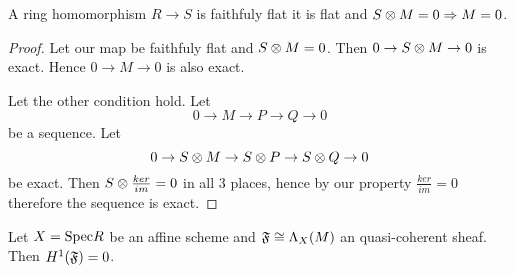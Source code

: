 



\begin{lemma}
A ring homomorphism $R\rightarrow S$ is faithfuly flat \iff it is flat and $S\otimes M=0 \Rightarrow M=0$.
\end{lemma}
\begin{proof}
Let our map be faithfuly flat and $S\otimes M=0$. Then $0\rightarrow S\otimes M\rightarrow 0$ is exact. 
Hence $0\rightarrow M\rightarrow 0$ is also exact.

Let the other condition hold. 
Let \[0\rightarrow M \rightarrow P \rightarrow Q \rightarrow 0 \] be a sequence.
Let \[0\rightarrow S\otimes M \rightarrow S\otimes P \rightarrow S\otimes Q \rightarrow 0 \]
be exact. Then $S\otimes\frac{ker}{im}=0$ in all 3 places, hence by our property $\frac{ker}{im}=0$ therefore the sequence is exact.
\end{proof}
\begin{theorem}
Let $X=\Spec R$ be an affine scheme and $\mathfrak{F}\cong \Lambda_X(M)$ an quasi-coherent sheaf.
Then $H^1(\mathfrak{F})=0$.
\end{theorem}
